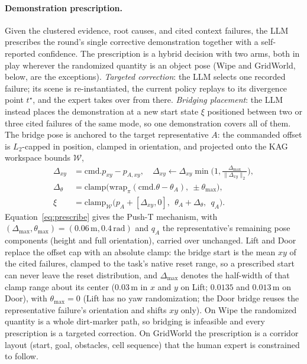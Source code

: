 \documentclass[letterpaper]{article} %
\begin{document}
\paragraph{Demonstration prescription.}
Given the clustered evidence, root causes, and cited context failures, the
LLM prescribes the round's single corrective demonstration together with a
self-reported confidence. The prescription is a hybrid decision with two
arms, both in play wherever the randomized quantity is an object pose
(Wipe and GridWorld, below, are the exceptions). \emph{Targeted correction}: the LLM selects one
recorded failure; its scene is re-instantiated, the current policy replays to
its divergence point $t^\star$, and the expert takes over from there.
\emph{Bridging placement}: the LLM instead places the demonstration at
a new start state $\xi$ positioned between two or three cited failures of the
same mode, so one demonstration covers all of them. The bridge pose is
anchored to the target representative $A$: the commanded offset is
$L_2$-capped in position, clamped in orientation, and projected onto the KAG
workspace bounds $\mathcal{W}$,
\begin{align}
\Delta_{xy}&=\mathrm{cmd}.p_{xy}-p_{A,xy},
\quad
\Delta_{xy}\leftarrow
\Delta_{xy}\min\!\Big(1,\tfrac{\Delta_{\max}}{\|\Delta_{xy}\|_2}\Big),
\nonumber\\
\Delta_{\theta}&=\mathrm{clamp}\big(
\mathrm{wrap}_{\pi}(\mathrm{cmd}.\theta-\theta_A),\ \pm\theta_{\max}\big),
\nonumber\\
\xi&=\mathrm{clamp}_{\mathcal{W}}\big(
p_A+[\Delta_{xy},0],\ \ \theta_A+\Delta_{\theta},\ \ q_A\big).
\label{eq:prescribe}
\end{align}
Equation~\ref{eq:prescribe} gives the Push-T mechanism, with
$(\Delta_{\max},\theta_{\max})=(0.06\,\mathrm{m},0.4\,\mathrm{rad})$ and
$q_A$ the representative's remaining pose components (height and full
orientation), carried over unchanged. Lift
and Door replace the offset cap with an absolute clamp: the bridge start is
the mean $xy$ of the cited failures, clamped to the task's native reset
range, so a prescribed start can never leave the reset distribution, and
$\Delta_{\max}$ denotes the half-width of that clamp range about its center
($0.03$\,m in $x$ and $y$ on Lift; $0.0135$ and $0.013$\,m on Door), with
$\theta_{\max}=0$ (Lift has no yaw randomization; the Door bridge reuses
the representative failure's orientation and shifts $xy$ only). On Wipe
the randomized quantity is a whole dirt-marker path, so bridging is
infeasible and every prescription is a targeted correction. On GridWorld the
prescription is a corridor layout (start, goal, obstacles, cell sequence)
that the human expert is constrained to follow.
\end{document}
